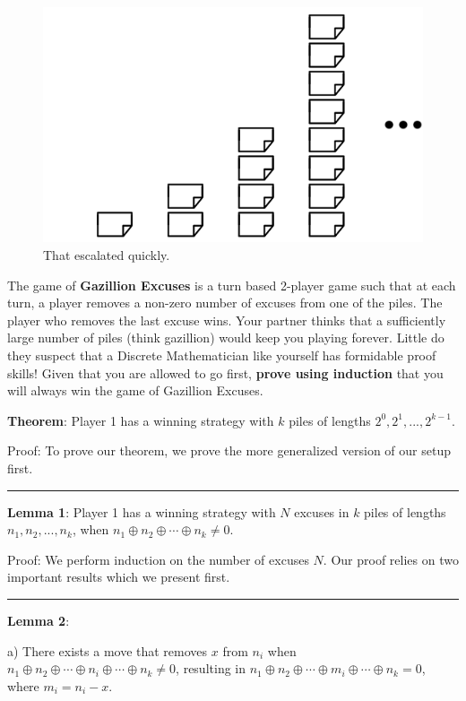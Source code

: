 \documentclass[addpoints]{exam}
\begin{document}
\begin{questions}
\begin{figure}[ht]
  \centering
  \includegraphics{excuses.png}
  \caption{That escalated quickly.}
  \label{fig:Piles of excuses}
\end{figure}

The game of \textbf{Gazillion Excuses} is a turn based 2-player game such that at each turn, a player removes a non-zero number of excuses from one of the piles. The player who removes the last excuse wins. Your partner thinks that a sufficiently large number of piles (think gazillion) would keep you playing forever. Little do they suspect that a Discrete Mathematician like yourself has formidable proof skills! Given that you are allowed to go first, \textbf{prove using induction} that you will always win the game of Gazillion Excuses. 

\begin{solution}

\textbf{Theorem}: Player 1 has a winning strategy with $k$ piles of lengths $2^0, 2^1, ..., 2^{k-1}$.

Proof: To prove our theorem, we prove the more generalized version of our setup first.
\\
\hrule
\textbf{Lemma 1}: Player 1 has a winning strategy with $N$ excuses in $k$ piles of lengths $n_1,n_2,...,n_k$, when $n_1 \oplus n_2 \oplus \cdots \oplus n_k \not = 0$.

Proof: We perform induction on the number of excuses $N$. Our proof relies on two important results which we present first.
\\
\hrule

\textbf{Lemma 2}: 

a) There exists a move that removes $x$ from $n_i$ when $n_1 \oplus n_2 \oplus \cdots \oplus n_i \oplus \cdots \oplus n_k \not = 0$, resulting in $n_1 \oplus n_2 \oplus \cdots \oplus m_i \oplus \cdots \oplus n_k = 0$, where $m_i = n_i - x$.


\end{solution}
\end{questions}
\end{document}
